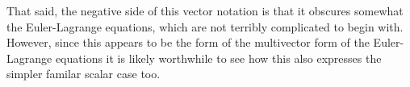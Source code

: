 \documentclass{article}
\begin{document}
That said, the negative side of this vector notation is that 
it obscures somewhat the Euler-Lagrange equations, which are not terribly complicated to begin with.  However, since this appears to be the form
of the multivector form of the Euler-Lagrange equations it is likely worthwhile to see how this also expresses the simpler familar scalar case too.

\end{document}
